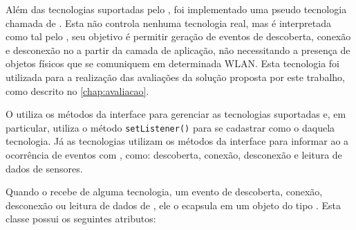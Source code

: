 Além das tecnologias suportadas pelo \mhub, foi implementado uma pseudo tecnologia chamada de \faketechnology.
Esta não controla nenhuma tecnologia real, mas é interpretada como tal pelo \stwopa, seu objetivo é permitir geração de eventos de descoberta, conexão e desconexão no \stwopa a partir da camada de aplicação, não necessitando a presença de objetos físicos que se comuniquem em determinada WLAN.
Esta tecnologia foi utilizada para a realização das avaliações da solução proposta por este trabalho, como descrito no \autoref{chap:avaliacao}.

O \stwopaservice utiliza os métodos da interface \techinterface para gerenciar as tecnologias suportadas e, em particular, utiliza o método \texttt{setListener(\techlistener)} para se cadastrar como o \listener daquela tecnologia. Já as tecnologias utilizam os métodos da interface \techlistener para informar ao \stwopaservice a ocorrência de eventos com \smartobjs, como: descoberta, conexão, desconexão e leitura de dados de sensores.

Quando o \stwopaservice recebe de alguma tecnologia, um evento de descoberta, conexão, desconexão ou leitura de dados de \smartobjs, ele o ecapsula em um objeto do tipo \sensordata.
Esta classe possui os seguintes atributos:

